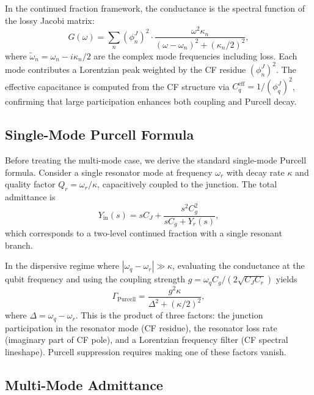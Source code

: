 \documentclass[reprint, floatfix, superscriptaddress, amsmath, amssymb, longbibliography]{revtex4-2}
\newcommand{\Yin}{Y_{\mathrm{in}}}
\begin{document}
In the continued fraction framework, the conductance is the spectral function of the lossy Jacobi matrix:
\begin{equation}
G(\omega) = \sum_n (\phi_n^J)^2 \cdot \frac{\omega^2 \kappa_n}{(\omega - \omega_n)^2 + (\kappa_n/2)^2},
\end{equation}
where $\tilde{\omega}_n = \omega_n - i\kappa_n/2$ are the complex mode frequencies including loss. Each mode contributes a Lorentzian peak weighted by the CF residue $(\phi_n^J)^2$. The effective capacitance is computed from the CF structure via $C_q^{\mathrm{eff}} = 1/(\phi_q^J)^2$, confirming that large participation enhances both coupling and Purcell decay.

\subsection{Single-Mode Purcell Formula}
\label{sec:single_mode_purcell}

Before treating the multi-mode case, we derive the standard single-mode Purcell formula. Consider a single resonator mode at frequency $\omega_r$ with decay rate $\kappa$ and quality factor $Q_r = \omega_r/\kappa$, capacitively coupled to the junction. The total admittance is
\begin{equation}
\Yin(s) = sC_J + \frac{s^2 C_g^2}{sC_g + Y_r(s)},
\label{eq:Yin_single_mode}
\end{equation}
which corresponds to a two-level continued fraction with a single resonant branch.

In the dispersive regime where $|\omega_q - \omega_r| \gg \kappa$, evaluating the conductance at the qubit frequency and using the coupling strength $g = \omega_q C_g/(2\sqrt{C_J C_r})$ yields
\begin{equation}
\Gamma_{\mathrm{Purcell}} = \frac{g^2 \kappa}{\Delta^2 + (\kappa/2)^2},
\label{eq:Purcell_full}
\end{equation}
where $\Delta = \omega_q - \omega_r$. This is the product of three factors: the junction participation in the resonator mode (CF residue), the resonator loss rate (imaginary part of CF pole), and a Lorentzian frequency filter (CF spectral lineshape). Purcell suppression requires making one of these factors vanish.

\subsection{Multi-Mode Admittance}
\label{sec:multimode_admittance}
\end{document}
